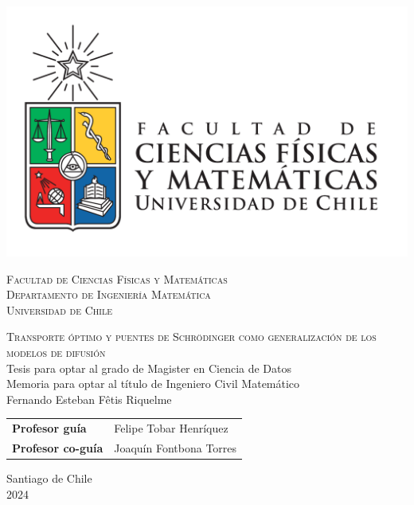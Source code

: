 \begin{titlepage}
	\hspace{0cm}\vspace{-2cm}
	\begin{LARGE}

		\begin{minipage}{0.10\linewidth}
			\includegraphics[width=\textwidth]{images/uchile}
		\end{minipage}
		\hfill
		\begin{minipage}{0.88\linewidth}
			\vspace{1.2cm}
			{\scshape
				Facultad de Ciencias Físicas y Matemáticas\\
				Departamento de Ingeniería Matemática\\
				Universidad de Chile}
		\end{minipage}

		\centering

		\vspace{3cm}
		{\Huge\scshape
			Transporte óptimo y puentes de Schrödinger como generalización de los modelos de difusión}\\
		\vspace{2.5cm}
		Tesis para optar al grado de Magister en Ciencia de Datos\\
		\vspace{0.1cm}
		Memoria para optar al título de Ingeniero Civil Matemático\\

		\vspace{2.5cm}
		{\huge Fernando Esteban Fêtis Riquelme}\\
		\vspace{2.5cm}
		\begin{tabular}{ll}
			\textbf{Profesor guía}    & Felipe Tobar Henríquez  \\
			\textbf{Profesor co-guía} & Joaquín Fontbona Torres \\
		\end{tabular}

		\vfill
		Santiago de Chile\\2024

	\end{LARGE}

\end{titlepage}